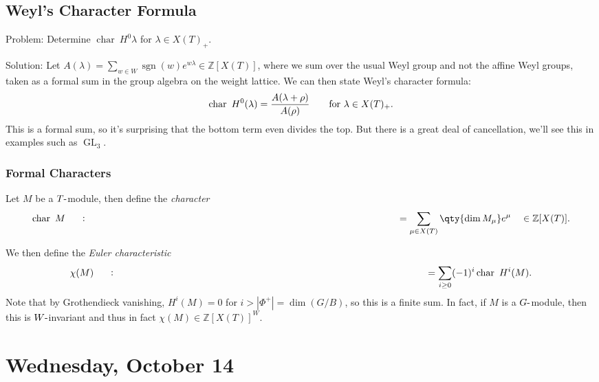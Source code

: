 \hypertarget{weyls-character-formula}{%
\subsection{Weyl's Character Formula}\label{weyls-character-formula}}

Problem: Determine \(\operatorname{char}~H^0 \lambda\) for
\(\lambda \in X(T)_+\).

Solution: Let
\(A(\lambda) = \sum_{w\in W} \operatorname{sgn}(w) e^{w\lambda} \in {\mathbb{Z}}[X(T)]\),
where we sum over the usual Weyl group and not the affine Weyl groups,
taken as a formal sum in the group algebra on the weight lattice. We can
then state Weyl's character formula:
\begin{align*}   \operatorname{char}~H^0(\lambda) = {A(\lambda + \rho) \over A(\rho)} \qquad \text{for }\lambda \in X(T)_+ .\end{align*}
This is a formal sum, so it's surprising that the bottom term even
divides the top. But there is a great deal of cancellation, we'll see
this in examples such as \(\operatorname{GL}_3\).

\hypertarget{formal-characters}{%
\subsubsection{Formal Characters}\label{formal-characters}}

Let \(M\) be a \(T{\hbox{-}}\)module, then define the \emph{character}
\begin{align*}   \operatorname{char}~M\mathrel{\vcenter{:}}=\sum_{\mu\in X(T)} \qty{\dim M_\mu} e^\mu \quad \in {\mathbb{Z}}[X(T)] .\end{align*}

We then define the \emph{Euler characteristic}
\begin{align*}   \chi(M) \mathrel{\vcenter{:}}=\sum_{i\geq 0} (-1)^i \operatorname{char}~H^i(M) .\end{align*}
Note that by Grothendieck vanishing, \(H^i(M) = 0\) for
\(i > {\left\lvert {\Phi^+} \right\rvert} = \dim(G/B)\), so this is a
finite sum. In fact, if \(M\) is a \(G{\hbox{-}}\)module, then this is
\(W{\hbox{-}}\)invariant and thus in fact
\(\chi(M) \in {\mathbb{Z}}[X(T)]^W\).

\hypertarget{wednesday-october-14}{%
\section{Wednesday, October 14}\label{wednesday-october-14}}

